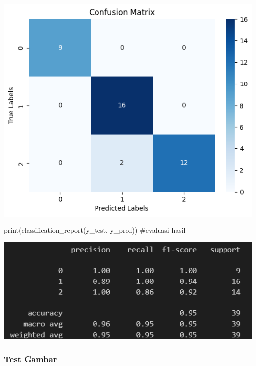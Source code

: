 \documentclass[
  letterpaper,
  DIV=11,
  numbers=noendperiod]{scrreprt}
\newenvironment{Shaded}{\begin{snugshade}}{\end{snugshade}}
\newcommand{\BuiltInTok}[1]{\textcolor[rgb]{0.00,0.23,0.31}{#1}}
\newcommand{\CommentTok}[1]{\textcolor[rgb]{0.37,0.37,0.37}{#1}}
\newcommand{\NormalTok}[1]{\textcolor[rgb]{0.00,0.23,0.31}{#1}}
\begin{document}
\includegraphics{Asset/confusion_sift_knn_optimasi.png}

\begin{Shaded}
\begin{Highlighting}[]
\BuiltInTok{print}\NormalTok{(classification\_report(y\_test, y\_pred)) }\CommentTok{\#evaluasi hasil}
\end{Highlighting}
\end{Shaded}

\includegraphics{Asset/classreport_sift_knn_optimasi.png}

\hypertarget{test-gambar-2}{%
\subsubsection*{Test Gambar}\label{test-gambar-2}}
\end{document}
